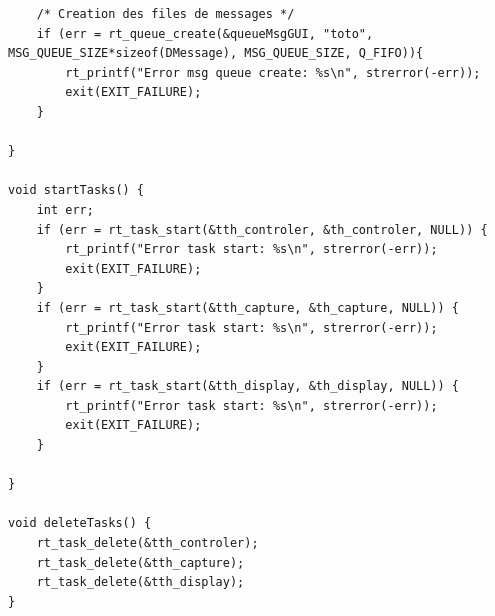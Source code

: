 \documentclass[11pt, a4paper]{paper}
\begin{document}
\begin{itemize}
\begin{lstlisting}
    /* Creation des files de messages */
    if (err = rt_queue_create(&queueMsgGUI, "toto", MSG_QUEUE_SIZE*sizeof(DMessage), MSG_QUEUE_SIZE, Q_FIFO)){
        rt_printf("Error msg queue create: %s\n", strerror(-err));
        exit(EXIT_FAILURE);
    }

}

void startTasks() {
    int err;
    if (err = rt_task_start(&tth_controler, &th_controler, NULL)) {
        rt_printf("Error task start: %s\n", strerror(-err));
        exit(EXIT_FAILURE);
    }
    if (err = rt_task_start(&tth_capture, &th_capture, NULL)) {
        rt_printf("Error task start: %s\n", strerror(-err));
        exit(EXIT_FAILURE);
    }
    if (err = rt_task_start(&tth_display, &th_display, NULL)) {
        rt_printf("Error task start: %s\n", strerror(-err));
        exit(EXIT_FAILURE);
    }

}

void deleteTasks() {
    rt_task_delete(&tth_controler);
    rt_task_delete(&tth_capture);
    rt_task_delete(&tth_display);
}
\end{lstlisting}
\end{itemize}
\end{document}

